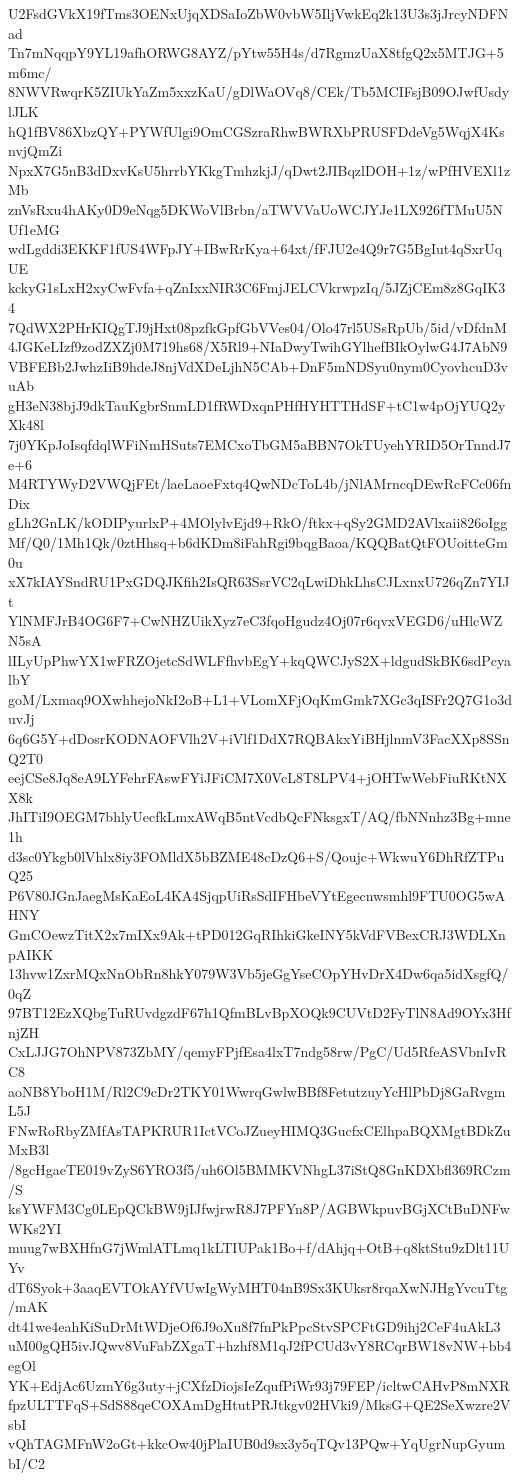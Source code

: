 U2FsdGVkX19fTms3OENxUjqXDSaIoZbW0vbW5IljVwkEq2k13U3s3jJrcyNDFNad
Tn7mNqqpY9YL19afhORWG8AYZ/pYtw55H4s/d7RgmzUaX8tfgQ2x5MTJG+5m6mc/
8NWVRwqrK5ZIUkYaZm5xxzKaU/gDlWaOVq8/CEk/Tb5MCIFsjB09OJwfUsdylJLK
hQ1fBV86XbzQY+PYWfUlgi9OmCGSzraRhwBWRXbPRUSFDdeVg5WqjX4KsnvjQmZi
NpxX7G5nB3dDxvKsU5hrrbYKkgTmhzkjJ/qDwt2JIBqzlDOH+1z/wPfHVEXl1zMb
znVsRxu4hAKy0D9eNqg5DKWoVlBrbn/aTWVVaUoWCJYJe1LX926fTMuU5NUf1eMG
wdLgddi3EKKF1fUS4WFpJY+IBwRrKya+64xt/fFJU2e4Q9r7G5BgIut4qSxrUqUE
kckyG1sLxH2xyCwFvfa+qZnIxxNIR3C6FmjJELCVkrwpzIq/5JZjCEm8z8GqIK34
7QdWX2PHrKIQgTJ9jHxt08pzfkGpfGbVVes04/Olo47rl5USsRpUb/5id/vDfdnM
4JGKeLIzf9zodZXZj0M719hs68/X5Rl9+NIaDwyTwihGYlhefBIkOylwG4J7AbN9
VBFEBb2JwhzIiB9hdeJ8njVdXDeLjhN5CAb+DnF5mNDSyu0nym0CyovhcuD3vuAb
gH3eN38bjJ9dkTauKgbrSnmLD1fRWDxqnPHfHYHTTHdSF+tC1w4pOjYUQ2yXk48l
7j0YKpJoIsqfdqlWFiNmHSuts7EMCxoTbGM5aBBN7OkTUyehYRID5OrTnndJ7e+6
M4RTYWyD2VWQjFEt/laeLaoeFxtq4QwNDcToL4b/jNlAMrncqDEwRcFCc06fnDix
gLh2GnLK/kODIPyurlxP+4MOlylvEjd9+RkO/ftkx+qSy2GMD2AVlxaii826oIgg
Mf/Q0/1Mh1Qk/0ztHhsq+b6dKDm8iFahRgi9bqgBaoa/KQQBatQtFOUoitteGm0u
xX7kIAYSndRU1PxGDQJKfih2IsQR63SsrVC2qLwiDhkLhsCJLxnxU726qZn7YIJt
YlNMFJrB4OG6F7+CwNHZUikXyz7eC3fqoHgudz4Oj07r6qvxVEGD6/uHlcWZN5sA
lILyUpPhwYX1wFRZOjetcSdWLFfhvbEgY+kqQWCJyS2X+ldgudSkBK6sdPcyalbY
goM/Lxmaq9OXwhhejoNkI2oB+L1+VLomXFjOqKmGmk7XGc3qISFr2Q7G1o3duvJj
6q6G5Y+dDosrKODNAOFVlh2V+iVlf1DdX7RQBAkxYiBHjlnmV3FacXXp8SSnQ2T0
eejCSe8Jq8eA9LYFehrFAswFYiJFiCM7X0VcL8T8LPV4+jOHTwWebFiuRKtNXX8k
JhITiI9OEGM7bhlyUecfkLmxAWqB5ntVcdbQcFNksgxT/AQ/fbNNnhz3Bg+mne1h
d3sc0Ykgb0lVhlx8iy3FOMldX5bBZME48cDzQ6+S/Qoujc+WkwuY6DhRfZTPuQ25
P6V80JGnJaegMsKaEoL4KA4SjqpUiRsSdIFHbeVYtEgecnwsmhl9FTU0OG5wAHNY
GmCOewzTitX2x7mIXx9Ak+tPD012GqRIhkiGkeINY5kVdFVBexCRJ3WDLXnpAIKK
13hvw1ZxrMQxNnObRn8hkY079W3Vb5jeGgYseCOpYHvDrX4Dw6qa5idXsgfQ/0qZ
97BT12EzXQbgTuRUvdgzdF67h1QfmBLvBpXOQk9CUVtD2FyTlN8Ad9OYx3HfnjZH
CxLJJG7OhNPV873ZbMY/qemyFPjfEsa4lxT7ndg58rw/PgC/Ud5RfeASVbnIvRC8
aoNB8YboH1M/Rl2C9cDr2TKY01WwrqGwlwBBf8FetutzuyYcHlPbDj8GaRvgmL5J
FNwRoRbyZMfAsTAPKRUR1IctVCoJZueyHIMQ3GucfxCElhpaBQXMgtBDkZuMxB3l
/8gcHgaeTE019vZyS6YRO3f5/uh6Ol5BMMKVNhgL37iStQ8GnKDXbfl369RCzm/S
ksYWFM3Cg0LEpQCkBW9jIJfwjrwR8J7PFYn8P/AGBWkpuvBGjXCtBuDNFwWKs2YI
muug7wBXHfnG7jWmlATLmq1kLTIUPak1Bo+f/dAhjq+OtB+q8ktStu9zDlt11UYv
dT6Syok+3aaqEVTOkAYfVUwIgWyMHT04nB9Sx3KUksr8rqaXwNJHgYvcuTtg/mAK
dt41we4eahKiSuDrMtWDjeOf6J9oXu8f7fnPkPpcStvSPCFtGD9ihj2CeF4uAkL3
uM00gQH5ivJQwv8VuFabZXgaT+hzhf8M1qJ2fPCUd3vY8RCqrBW18vNW+bb4egOl
YK+EdjAc6UzmY6g3uty+jCXfzDiojsIeZqufPiWr93j79FEP/icltwCAHvP8mNXR
fpzULTTFqS+SdS88qeCOXAmDgHtutPRJtkgv02HVki9/MksG+QE2SeXwzre2VsbI
vQhTAGMFnW2oGt+kkcOw40jPlaIUB0d9sx3y5qTQv13PQw+YqUgrNupGyumbI/C2
